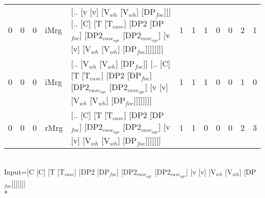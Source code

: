 \begin{tabularx}{\linewidth}{rrrlXrrrrrrr}
   0 &       0 &   0 & iMrg & [.. [v [v] [V$_{wh}$ [V$_{wh}$] [DP$_{foc}$]]] [.. [C] [T [T$_{case}$] [DP2 [DP$_{foc}$] [DP2$_{case_{agr}}$ [DP2$_{case_{agr}}$] [v [v] [V$_{wh}$ [V$_{wh}$] [DP$_{foc}$]]]]]]]]                                                           &             1 &             1 &            1 &              0 &             0 &          2 &        1 \\
   0 &       0 &   0 & iMrg & [.. [V$_{wh}$ [V$_{wh}$] [DP$_{foc}$]] [.. [C] [T [T$_{case}$] [DP2 [DP$_{foc}$] [DP2$_{case_{agr}}$ [DP2$_{case_{agr}}$] [v [v] [V$_{wh}$ [V$_{wh}$] [DP$_{foc}$]]]]]]]]                                                                   &             1 &             1 &            1 &              0 &             0 &          1 &        0 \\
   0 &       0 &   0 & rMrg & [.. [C] [T [T$_{case}$] [DP2 [DP$_{foc}$] [DP2$_{case_{agr}}$ [DP2$_{case_{agr}}$] [v [v] [V$_{wh}$ [V$_{wh}$] [DP$_{foc}$]]]]]]]                                                                                               &             1 &             1 &            0 &              0 &             0 &          2 &        3 \\
\hline
\end{tabularx}\endgroup\\
\begingroup\scriptsize Input=[C [C] [T [T$_{case}$] [DP2 [DP$_{foc}$] [DP2$_{case_{agr}}$ [DP2$_{case_{agr}}$] [v [v] [V$_{wh}$ [V$_{wh}$] [DP$_{foc}$]]]]]]]\\*
